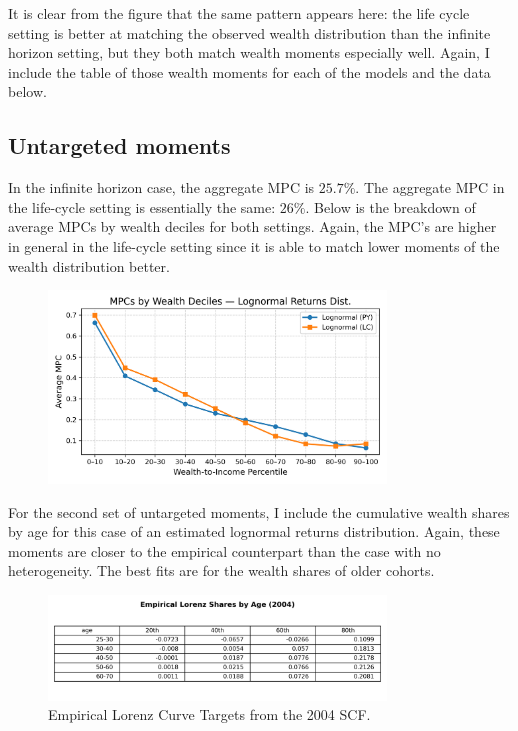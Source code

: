 \par It is clear from the figure that the same pattern appears here: the life cycle setting is better at matching the observed wealth distribution than the infinite horizon setting, but they both match wealth moments especially well. Again, I include the table of those wealth moments for each of the models and the data below. 




\subsection{Untargeted moments}

\par In the infinite horizon case, the aggregate MPC is $25.7\%$. The aggregate MPC in the life-cycle setting is essentially the same: $26\%$. Below is the breakdown of average MPCs by wealth deciles for both settings. Again, the MPC's are higher in general in the life-cycle setting since it is able to match lower moments of the wealth distribution better. 

\begin{figure}[htbp]
\centering
\includegraphics[width=0.8\textwidth]{Tables/Lognorm_PY_LC_MPC_by_WealthDecile_compare.png}
\label{fig:LognormPYLCMPCCompare}
\end{figure}


\par For the second set of untargeted moments, I include the cumulative wealth shares by age for this case of an estimated lognormal returns distribution. Again, these moments are closer to the empirical counterpart than the case with no heterogeneity. The best fits are for the wealth shares of older cohorts. 

\begin{figure}[h]
\centering
\includegraphics[width=0.8\textwidth]{Tables/Emp_Lorenz_by_age_2004.png}
\caption{Empirical Lorenz Curve Targets from the 2004 SCF.}
\label{fig:EmpLorenzTar}
\end{figure}

